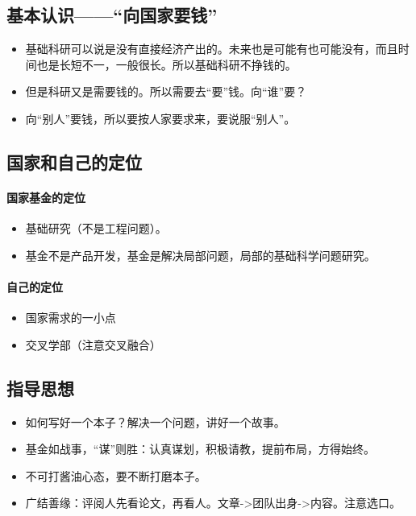 \subsection{基本认识——“向国家要钱”}
\begin{itemize}
\item 基础科研可以说是没有直接经济产出的。未来也是可能有也可能没有，而且时间也是长短不一，一般很长。所以基础科研不挣钱的。
\item 但是科研又是需要钱的。所以需要去“要”钱。向“谁”要？
\item 向“别人”要钱，所以要按人家要求来，要说服“别人”。
\end{itemize}


\subsection{国家和自己的定位}
\paragraph{国家基金的定位}
\begin{itemize}
\item 基础研究（不是工程问题）。
\item 基金不是产品开发，基金是解决局部问题，局部的基础科学问题研究。
\end{itemize}

\paragraph{自己的定位}
\begin{itemize}
\item 国家需求的一小点
\item 交叉学部（注意交叉融合）
\end{itemize}


\subsection{指导思想}
\begin{itemize}
\item 如何写好一个本子？解决一个问题，讲好一个故事。

\item 基金如战事，“谋”则胜：认真谋划，积极请教，提前布局，方得始终。

\item 不可打酱油心态，要不断打磨本子。

\item 广结善缘：评阅人先看论文，再看人。文章->团队出身->内容。注意选口。
\end{itemize}


